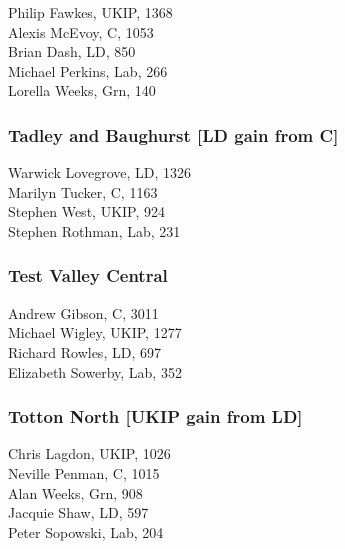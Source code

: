 \documentclass[a4paper,openany,10pt]{book}
\begin{document}


Philip Fawkes, UKIP, 1368\\
Alexis McEvoy, C, 1053\\
Brian Dash, LD, 850\\
Michael Perkins, Lab, 266\\
Lorella Weeks, Grn, 140\\


\subsubsection*{Tadley and Baughurst \hspace*{\fill}\nolinebreak[1]%
\enspace\hspace*{\fill}
[LD gain from C]}



Warwick Lovegrove, LD, 1326\\
Marilyn Tucker, C, 1163\\
Stephen West, UKIP, 924\\
Stephen Rothman, Lab, 231\\


\subsubsection*{Test Valley Central}



Andrew Gibson, C, 3011\\
Michael Wigley, UKIP, 1277\\
Richard Rowles, LD, 697\\
Elizabeth Sowerby, Lab, 352\\


\subsubsection*{Totton North \hspace*{\fill}\nolinebreak[1]%
\enspace\hspace*{\fill}
[UKIP gain from LD]}



Chris Lagdon, UKIP, 1026\\
Neville Penman, C, 1015\\
Alan Weeks, Grn, 908\\
Jacquie Shaw, LD, 597\\
Peter Sopowski, Lab, 204\\
\end{document}

